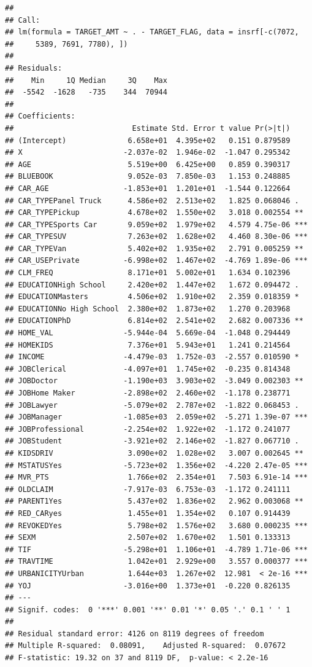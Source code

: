 \documentclass[]{article}
\begin{document}
\begin{verbatim}
## 
## Call:
## lm(formula = TARGET_AMT ~ . - TARGET_FLAG, data = insrf[-c(7072, 
##     5389, 7691, 7780), ])
## 
## Residuals:
##    Min     1Q Median     3Q    Max 
##  -5542  -1628   -735    344  70944 
## 
## Coefficients:
##                           Estimate Std. Error t value Pr(>|t|)    
## (Intercept)              6.658e+01  4.395e+02   0.151 0.879589    
## X                       -2.037e-02  1.946e-02  -1.047 0.295342    
## AGE                      5.519e+00  6.425e+00   0.859 0.390317    
## BLUEBOOK                 9.052e-03  7.850e-03   1.153 0.248885    
## CAR_AGE                 -1.853e+01  1.201e+01  -1.544 0.122664    
## CAR_TYPEPanel Truck      4.586e+02  2.513e+02   1.825 0.068046 .  
## CAR_TYPEPickup           4.678e+02  1.550e+02   3.018 0.002554 ** 
## CAR_TYPESports Car       9.059e+02  1.979e+02   4.579 4.75e-06 ***
## CAR_TYPESUV              7.263e+02  1.628e+02   4.460 8.30e-06 ***
## CAR_TYPEVan              5.402e+02  1.935e+02   2.791 0.005259 ** 
## CAR_USEPrivate          -6.998e+02  1.467e+02  -4.769 1.89e-06 ***
## CLM_FREQ                 8.171e+01  5.002e+01   1.634 0.102396    
## EDUCATIONHigh School     2.420e+02  1.447e+02   1.672 0.094472 .  
## EDUCATIONMasters         4.506e+02  1.910e+02   2.359 0.018359 *  
## EDUCATIONNo High School  2.380e+02  1.873e+02   1.270 0.203968    
## EDUCATIONPhD             6.814e+02  2.541e+02   2.682 0.007336 ** 
## HOME_VAL                -5.944e-04  5.669e-04  -1.048 0.294449    
## HOMEKIDS                 7.376e+01  5.943e+01   1.241 0.214564    
## INCOME                  -4.479e-03  1.752e-03  -2.557 0.010590 *  
## JOBClerical             -4.097e+01  1.745e+02  -0.235 0.814348    
## JOBDoctor               -1.190e+03  3.903e+02  -3.049 0.002303 ** 
## JOBHome Maker           -2.898e+02  2.460e+02  -1.178 0.238771    
## JOBLawyer               -5.079e+02  2.787e+02  -1.822 0.068453 .  
## JOBManager              -1.085e+03  2.059e+02  -5.271 1.39e-07 ***
## JOBProfessional         -2.254e+02  1.922e+02  -1.172 0.241077    
## JOBStudent              -3.921e+02  2.146e+02  -1.827 0.067710 .  
## KIDSDRIV                 3.090e+02  1.028e+02   3.007 0.002645 ** 
## MSTATUSYes              -5.723e+02  1.356e+02  -4.220 2.47e-05 ***
## MVR_PTS                  1.766e+02  2.354e+01   7.503 6.91e-14 ***
## OLDCLAIM                -7.917e-03  6.753e-03  -1.172 0.241111    
## PARENT1Yes               5.437e+02  1.836e+02   2.962 0.003068 ** 
## RED_CARyes               1.455e+01  1.354e+02   0.107 0.914439    
## REVOKEDYes               5.798e+02  1.576e+02   3.680 0.000235 ***
## SEXM                     2.507e+02  1.670e+02   1.501 0.133313    
## TIF                     -5.298e+01  1.106e+01  -4.789 1.71e-06 ***
## TRAVTIME                 1.042e+01  2.929e+00   3.557 0.000377 ***
## URBANICITYUrban          1.644e+03  1.267e+02  12.981  < 2e-16 ***
## YOJ                     -3.016e+00  1.373e+01  -0.220 0.826135    
## ---
## Signif. codes:  0 '***' 0.001 '**' 0.01 '*' 0.05 '.' 0.1 ' ' 1
## 
## Residual standard error: 4126 on 8119 degrees of freedom
## Multiple R-squared:  0.08091,    Adjusted R-squared:  0.07672 
## F-statistic: 19.32 on 37 and 8119 DF,  p-value: < 2.2e-16
\end{verbatim}
\end{document}
